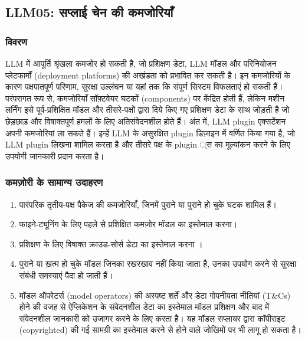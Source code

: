 \documentclass[
]{article}
\author{}
\date{}
\providecommand{\tightlist}{%
  \setlength{\itemsep}{0pt}\setlength{\parskip}{0pt}}
\begin{document}
\subsection{LLM05: सप्लाई चेन की
कमजोरियाँ}\label{llm05-ux938ux92aux932ux908-ux91aux928-ux915-ux915ux92eux91cux930ux92f}

\subsubsection{विवरण}\label{ux935ux935ux930ux923}

LLM में आपूर्ति श्रृंखला कमजोर हो सकती है, जो प्रशिक्षण डेटा, LLM मॉडल और परिनियोजन
प्लेटफार्मों (deployment platforms) की अखंडता को प्रभावित कर सकती है। इन
कमजोरियों के कारण पक्षपातपूर्ण परिणाम, सुरक्षा उल्लंघन या यहां तक कि संपूर्ण सिस्टम
विफलताएं हो सकती हैं। परंपरागत रूप से, कमजोरियाँ सॉफ़्टवेयर घटकों (components) पर
केंद्रित होती हैं, लेकिन मशीन लर्निंग इसे पूर्व-प्रशिक्षित मॉडल और तीसरे-पक्षों द्वारा
दिये किए गए प्रशिक्षण डेटा के साथ जोड़ती है जो छेड़छाड़ और विषाक्तपूर्ण हमलों के लिए
अतिसंवेदनशील होते हैं। अंत में, LLM plugin एक्सटेंशन अपनी कमजोरियां ला सकते हैं। इन्हें
LLM के असुरक्षित plugin डिज़ाइन में वर्णित किया गया है, जो LLM plugin लिखना
शामिल करता है और तीसरे पक्ष के plugin ्स का मूल्यांकन करने के लिए उपयोगी जानकारी
प्रदान करता है।

\subsubsection{कमज़ोरी के सामान्य
उदाहरण}\label{ux915ux92eux95bux930-ux915-ux938ux92eux928ux92f-ux909ux926ux939ux930ux923}

\begin{enumerate}
\def\labelenumi{\arabic{enumi}.}
\tightlist
\item
  पारंपरिक तृतीय-पक्ष पैकेज की कमजोरियाँ, जिनमें पुराने या पुराने हो चुके घटक शामिल हैं।
\item
  फाइने-ट्यूनिंग के लिए पहले से प्रशिक्षित कमज़ोर मॉडल का इस्तेमाल करना।
\item
  प्रशिक्षण के लिए विषाक्त क्राउड-सोर्स डेटा का इस्तेमाल करना ।
\item
  पुराने या ख़त्म हो चुके मॉडल जिनका रखरखाव नहीं किया जाता है, उनका उपयोग करने से
  सुरक्षा संबंधी समस्याएं पैदा हो जाती हैं।
\item
  मॉडल ऑपरेटर्स (model operators) की अस्पष्ट शर्तें और डेटा गोपनीयता नीतियां
  (T\&Cs) होने की वजह से ऐप्लिकेशन के संवेदनशील डेटा का इस्तेमाल मॉडल प्रशिक्षण और
  बाद में संवेदनशील जानकारी को उजागर करने के लिए करता है। यह मॉडल सप्लायर द्वारा
  कॉपीराइट (copyrighted) की गई सामग्री का इस्तेमाल करने से होने वाले जोखिमों पर
  भी लागू हो सकता है।
\end{enumerate}
\end{document}
